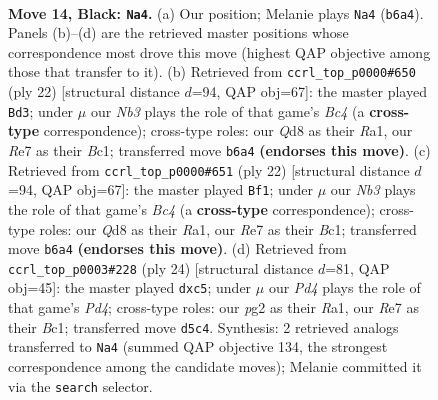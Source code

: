 \documentclass[11pt]{article}
\begin{document}
\clearpage

\begin{figure}[p]\centering
\begin{subfigure}{0.46\textwidth}\centering
\resizebox{\linewidth}{!}{%
\newchessgame
\chessboard[
  setfen={r1bq2k1/p3rppp/1n2pn2/2pp4/2P5/3BP1P1/PP3RPP/RNQ1N1K1 b - - 0 14},
  showmover=false,
  pgfstyle=straightmove, color=movearrow, markmove={b6-a4}
]}
\caption{}
\end{subfigure}\hfill
\begin{subfigure}{0.46\textwidth}\centering
\resizebox{\linewidth}{!}{%
\newchessgame
\chessboard[
  setfen={rn3rk1/pbq2ppp/1p2pn2/2p5/2BP4/P1P1PN2/5PPP/R1BQR1K1 w - - 3 12},
  showmover=false,
  pgfstyle=straightmove, color=movearrow, markmove={c4-d3}
]}
\caption{}
\end{subfigure}
\\[4pt]
\begin{subfigure}{0.46\textwidth}\centering
\resizebox{\linewidth}{!}{%
\newchessgame
\chessboard[
  setfen={rn3rk1/pbq2ppp/1p2pn2/2p5/2BP4/P1P1PN2/5PPP/R1BQR1K1 w - - 3 12},
  showmover=false,
  pgfstyle=straightmove, color=movearrow, markmove={c4-f1}
]}
\caption{}
\end{subfigure}\hfill
\begin{subfigure}{0.46\textwidth}\centering
\resizebox{\linewidth}{!}{%
\newchessgame
\chessboard[
  setfen={rn3rk1/4bppp/pq2p3/1ppb4/3P4/1P2PNP1/P4PBP/R1BQR1K1 w - - 1 13},
  showmover=false,
  pgfstyle=straightmove, color=movearrow, markmove={d4-c5}
]}
\caption{}
\end{subfigure}
\caption{\textbf{Move 14, Black: \texttt{Na4}.} (a) Our position; Melanie plays \texttt{Na4} (\texttt{b6a4}). Panels (b)--(d) are the retrieved master positions whose correspondence most drove this move (highest QAP objective among those that transfer to it). (b) Retrieved from \texttt{ccrl\_top\_p0000\#650} (ply 22) [structural distance $d$=94, QAP obj=67]: the master played \texttt{Bd3}; under $\mu$ our \emph{Nb3} plays the role of that game's \emph{Bc4} (a \textbf{cross-type} correspondence); cross-type roles: our \emph{Q}d8 as their \emph{R}a1, our \emph{R}e7 as their \emph{B}c1; transferred move \texttt{b6a4} \textbf{(endorses this move)}. (c) Retrieved from \texttt{ccrl\_top\_p0000\#651} (ply 22) [structural distance $d$=94, QAP obj=67]: the master played \texttt{Bf1}; under $\mu$ our \emph{Nb3} plays the role of that game's \emph{Bc4} (a \textbf{cross-type} correspondence); cross-type roles: our \emph{Q}d8 as their \emph{R}a1, our \emph{R}e7 as their \emph{B}c1; transferred move \texttt{b6a4} \textbf{(endorses this move)}. (d) Retrieved from \texttt{ccrl\_top\_p0003\#228} (ply 24) [structural distance $d$=81, QAP obj=45]: the master played \texttt{dxc5}; under $\mu$ our \emph{Pd4} plays the role of that game's \emph{Pd4}; cross-type roles: our \emph{p}g2 as their \emph{R}a1, our \emph{R}e7 as their \emph{B}c1; transferred move \texttt{d5c4}. Synthesis: 2 retrieved analogs transferred to \texttt{Na4} (summed QAP objective 134, the strongest correspondence among the candidate moves); Melanie committed it via the \texttt{search} selector.}
\label{fig:thought-m27}
\end{figure}
\end{document}
